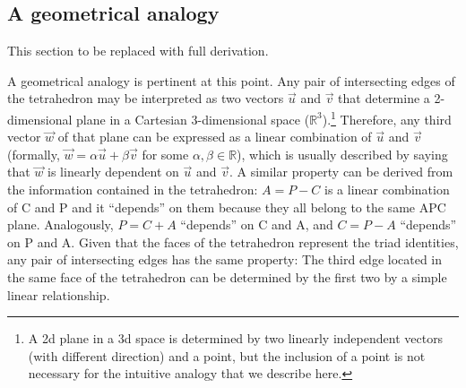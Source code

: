 \documentclass[12pt,oneside,a4paper]{article} %
\newcommand\vt[1]{\textcolor{rd}{#1}}
\begin{document}

\subsection{A geometrical analogy}
\vt{This section to be replaced with full derivation.}

A geometrical analogy is pertinent at this point. Any pair of intersecting edges
of the tetrahedron may be interpreted as two vectors $\vec{u}$ and $\vec{v}$
that determine a 2-dimensional plane in a Cartesian 3-dimensional
space ($\mathbb{R}^3$).\footnote{A 2d plane in a 3d space is determined by two linearly independent
vectors (with different direction) and a point, but the inclusion of a point is not
necessary for the intuitive analogy that we describe here.} Therefore, any third
vector $\vec{w}$ of that plane can be expressed as a linear combination of
$\vec{u}$ and $\vec{v}$ (formally, $\vec{w}=\alpha\vec{u}+\beta\vec{v}$ for some $\alpha, \beta \in \mathbb{R}$), which is usually
described by saying that $\vec{w}$ is linearly dependent on $\vec{u}$ and
$\vec{v}$.
A similar property can be derived from the information contained in the
tetrahedron: $A=P-C$ is a linear combination of C and P and it ``depends''
on them because they all belong to the same APC plane. Analogously, $P=C+A$
``depends'' on C and A, and $C=P-A$ ``depends'' on P and A. Given that the faces of the tetrahedron represent the triad identities, any pair of intersecting edges has the same property: The third edge located in the same face of the tetrahedron can be determined by the first two by a simple linear relationship.
\end{document}
